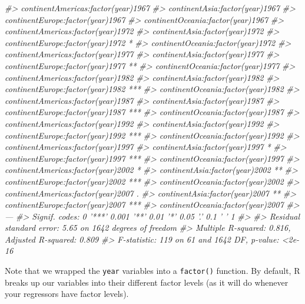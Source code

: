 \documentclass[]{book}
\newenvironment{Shaded}{\begin{snugshade}}{\end{snugshade}}
\newcommand{\CommentTok}[1]{\textcolor[rgb]{0.56,0.35,0.01}{\textit{#1}}}
\begin{document}
\begin{Shaded}
\begin{Highlighting}[]
\CommentTok{#> continentAmericas:factor(year)1967    }
\CommentTok{#> continentAsia:factor(year)1967        }
\CommentTok{#> continentEurope:factor(year)1967      }
\CommentTok{#> continentOceania:factor(year)1967     }
\CommentTok{#> continentAmericas:factor(year)1972    }
\CommentTok{#> continentAsia:factor(year)1972        }
\CommentTok{#> continentEurope:factor(year)1972   *  }
\CommentTok{#> continentOceania:factor(year)1972     }
\CommentTok{#> continentAmericas:factor(year)1977    }
\CommentTok{#> continentAsia:factor(year)1977        }
\CommentTok{#> continentEurope:factor(year)1977   ** }
\CommentTok{#> continentOceania:factor(year)1977     }
\CommentTok{#> continentAmericas:factor(year)1982    }
\CommentTok{#> continentAsia:factor(year)1982        }
\CommentTok{#> continentEurope:factor(year)1982   ***}
\CommentTok{#> continentOceania:factor(year)1982     }
\CommentTok{#> continentAmericas:factor(year)1987    }
\CommentTok{#> continentAsia:factor(year)1987        }
\CommentTok{#> continentEurope:factor(year)1987   ***}
\CommentTok{#> continentOceania:factor(year)1987     }
\CommentTok{#> continentAmericas:factor(year)1992    }
\CommentTok{#> continentAsia:factor(year)1992        }
\CommentTok{#> continentEurope:factor(year)1992   ***}
\CommentTok{#> continentOceania:factor(year)1992     }
\CommentTok{#> continentAmericas:factor(year)1997    }
\CommentTok{#> continentAsia:factor(year)1997     *  }
\CommentTok{#> continentEurope:factor(year)1997   ***}
\CommentTok{#> continentOceania:factor(year)1997     }
\CommentTok{#> continentAmericas:factor(year)2002 *  }
\CommentTok{#> continentAsia:factor(year)2002     ** }
\CommentTok{#> continentEurope:factor(year)2002   ***}
\CommentTok{#> continentOceania:factor(year)2002     }
\CommentTok{#> continentAmericas:factor(year)2007 .  }
\CommentTok{#> continentAsia:factor(year)2007     ** }
\CommentTok{#> continentEurope:factor(year)2007   ***}
\CommentTok{#> continentOceania:factor(year)2007     }
\CommentTok{#> ---}
\CommentTok{#> Signif. codes:  0 '***' 0.001 '**' 0.01 '*' 0.05 '.' 0.1 ' ' 1}
\CommentTok{#> }
\CommentTok{#> Residual standard error: 5.65 on 1642 degrees of freedom}
\CommentTok{#> Multiple R-squared:  0.816,  Adjusted R-squared:  0.809 }
\CommentTok{#> F-statistic:  119 on 61 and 1642 DF,  p-value: <2e-16}
\end{Highlighting}
\end{Shaded}

Note that we wrapped the \texttt{year} variables into a \texttt{factor()} function. By default, R breaks up our variables into their different factor levels (as it will do whenever your regressors have factor levels).
\end{document}
